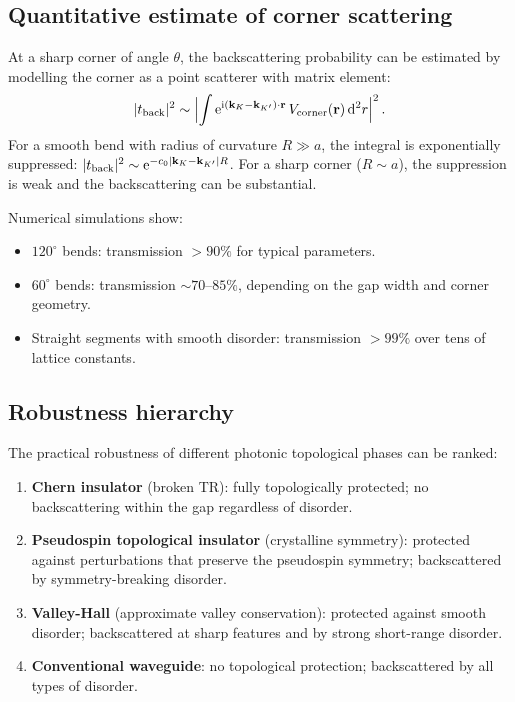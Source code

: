 \subsection{Quantitative estimate of corner scattering}
\label{sec:ch12-corner-scattering}

At a sharp corner of angle $\theta$, the backscattering probability
can be estimated by modelling the corner as a point scatterer with
matrix element:
\begin{equation}\label{eq:ch12-corner-scatter}
  |t_{\mathrm{back}}|^2 \sim
  \Bigl|\int\mathrm{e}^{\mathrm{i}(\mathbf{k}_K-\mathbf{k}_{K'})\cdot\mathbf{r}}\,
  V_{\mathrm{corner}}(\mathbf{r})\,\mathrm{d}^2r\Bigr|^2\,.
\end{equation}
For a smooth bend with radius of curvature $R\gg a$, the integral is
exponentially suppressed: $|t_{\mathrm{back}}|^2
\sim\mathrm{e}^{-c_0|\mathbf{k}_K-\mathbf{k}_{K'}|R}$.  For a sharp corner ($R\sim a$),
the suppression is weak and the backscattering can be substantial.

Numerical simulations show:
\begin{itemize}
  \item $120^\circ$ bends: transmission $>90\%$ for typical parameters.
  \item $60^\circ$ bends: transmission $\sim 70$--$85\%$, depending on
  the gap width and corner geometry.
  \item Straight segments with smooth disorder: transmission $>99\%$
  over tens of lattice constants.
\end{itemize}

\subsection{Robustness hierarchy}
\label{sec:ch12-hierarchy}

The practical robustness of different photonic topological phases can
be ranked:
\begin{enumerate}
  \item \textbf{Chern insulator} (broken TR): fully topologically
  protected; no backscattering within the gap regardless of disorder.
  \item \textbf{Pseudospin topological insulator} (crystalline
  symmetry): protected against perturbations that preserve the
  pseudospin symmetry; backscattered by symmetry-breaking disorder.
  \item \textbf{Valley-Hall} (approximate valley conservation):
  protected against smooth disorder; backscattered at sharp features
  and by strong short-range disorder.
  \item \textbf{Conventional waveguide}: no topological protection;
  backscattered by all types of disorder.
\end{enumerate}

